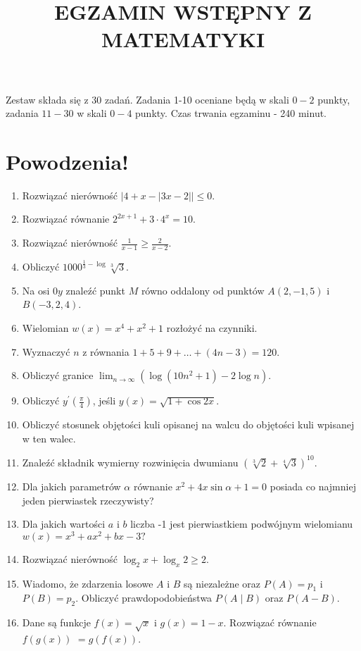 \documentclass[10pt]{article}
\title{EGZAMIN WSTĘPNY Z MATEMATYKI }
\author{}
\date{}
\begin{document}
\maketitle
Zestaw składa się z 30 zadań. Zadania 1-10 oceniane będą w skali \(0-2\) punkty, zadania \(11-30\) w skali \(0-4\) punkty. Czas trwania egzaminu - 240 minut.

\section*{Powodzenia!}
\begin{enumerate}
  \item Rozwiązać nierówność \(|4+x-|3 x-2|| \leqslant 0\).
  \item Rozwiązać równanie \(2^{2 x+1}+3 \cdot 4^{x}=10\).
  \item Rozwiązać nierówność \(\frac{1}{x-1} \geqslant \frac{2}{x-2}\).
  \item Obliczyć \(1000^{\frac{1}{3}-\log } \sqrt[3]{3}\).
  \item Na osi \(0 y\) znaleźć punkt \(M\) równo oddalony od punktów \(A(2,-1,5)\) i \(B(-3,2,4)\).
  \item Wielomian \(w(x)=x^{4}+x^{2}+1\) rozłożyć na czynniki.
  \item Wyznaczyć \(n\) z równania \(1+5+9+\ldots+(4 n-3)=120\).
  \item Obliczyć granice \(\lim _{n \rightarrow \infty}\left(\log \left(10 n^{2}+1\right)-2 \log n\right)\).
  \item Obliczyć \(y^{\prime}\left(\frac{\pi}{4}\right)\), jeśli \(y(x)=\sqrt{1+\cos 2 x}\).
  \item Obliczyć stosunek objętości kuli opisanej na walcu do objętości kuli wpisanej w ten walec.
  \item Znaleźć składnik wymierny rozwinięcia dwumianu \((\sqrt[3]{2}+\sqrt[4]{3})^{10}\).
  \item Dla jakich parametrów \(\alpha\) równanie \(x^{2}+4 x \sin \alpha+1=0\) posiada co najmniej jeden pierwiastek rzeczywisty?
  \item Dla jakich wartości \(a\) i \(b\) liczba -1 jest pierwiastkiem podwójnym wielomianu \(w(x)=x^{3}+a x^{2}+b x-3 ?\)
  \item Rozwiązać nierówność \(\log _{2} x+\log _{x} 2 \geqslant 2\).
  \item Wiadomo, że zdarzenia losowe \(A\) i \(B\) są niezależne oraz \(P(A)=p_{1}\) i \(P(B)=p_{2}\). Obliczyć prawdopodobieństwa \(P(A \mid B)\) oraz \(P(A-B)\).
  \item Dane są funkcje \(f(x)=\sqrt{x}\) i \(g(x)=1-x\). Rozwiązać równanie \(f(g(x))\) \(=g(f(x))\).

\end{enumerate}
\end{document}
